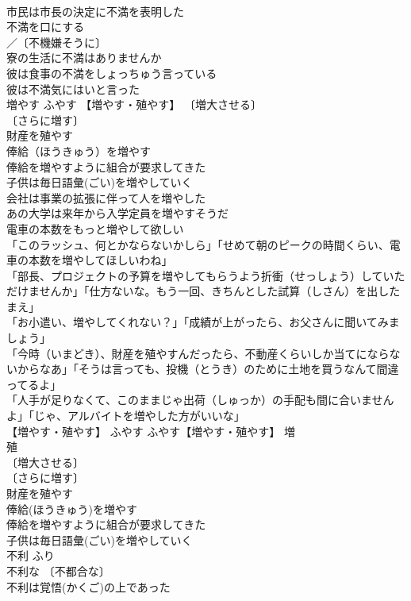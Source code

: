 \documentclass[8pt]{extreport}
\begin{document}
\begin{CJK}{UTF8}{min}
\\	市民は市長の決定に不満を表明した 
\\	不満を口にする 
\\	／〔不機嫌そうに〕
\\	寮の生活に不満はありませんか 
\\	彼は食事の不満をしょっちゅう言っている 
\\	彼は不満気にはいと言った 
\\	増やす	ふやす	【増やす・殖やす】 〔増大させる〕
\\	〔さらに増す〕
\\	財産を殖やす 
\\	俸給（ほうきゅう）を増やす 
\\	俸給を増やすように組合が要求してきた 
\\	子供は毎日語彙(ごい)を増やしていく 
\\	会社は事業の拡張に伴って人を増やした 
\\	あの大学は来年から入学定員を増やすそうだ 
\\	電車の本数をもっと増やして欲しい 
\\	「このラッシュ、何とかならないかしら」「せめて朝のピークの時間くらい、電車の本数を増やしてほしいわね」 
\\	「部長、プロジェクトの予算を増やしてもらうよう折衝（せっしょう）していただけませんか」「仕方ないな。もう一回、きちんとした試算（しさん）を出したまえ」 
\\	「お小遣い、増やしてくれない？」「成績が上がったら、お父さんに聞いてみましょう」 
\\	「今時（いまどき）、財産を殖やすんだったら、不動産くらいしか当てにならないからなあ」「そうは言っても、投機（とうき）のために土地を買うなんて間違ってるよ」 
\\	「人手が足りなくて、このままじゃ出荷（しゅっか）の手配も間に合いませんよ」「じゃ、アルバイトを増やした方がいいな」 
\\	【増やす・殖やす】	ふやす	ふやす【増やす・殖やす】 増　
\\	殖 
\\	〔増大させる〕
\\	〔さらに増す〕
\\	財産を殖やす 
\\	俸給(ほうきゅう)を増やす 
\\	俸給を増やすように組合が要求してきた 
\\	子供は毎日語彙(ごい)を増やしていく 
\\	不利	ふり	
\\	不利な 〔不都合な〕
\\	不利は覚悟(かくご)の上であった 

\end{CJK}
\end{document}
